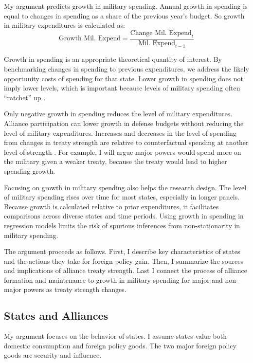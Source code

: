 \documentclass[12pt]{article}
\begin{document}
My argument predicts growth in military spending. 
Annual growth in spending is equal to changes in spending as a share of the previous year's budget. 
So growth in military expenditures is calculated as:
\begin{equation}
\mbox{Growth Mil. Expend} = \frac{ \mbox{Change Mil. Expend}_t }{ \mbox{Mil. Expend}_{t-1} }
\end{equation} 


Growth in spending is an appropriate theoretical quantity of interest. 
By benchmarking changes in spending to previous expenditures, we address the likely opportunity costs of spending for that state. 
Lower growth in spending does not imply lower levels, which is important because levels of military spending often ``ratchet'' up \citep{Zielinskietal2017}. 
 
Only negative growth in spending reduces the level of military expenditures. 
Alliance participation can lower growth in defense budgets without reducing the level of military expenditures. 
Increases and decreases in the level of spending from changes in treaty strength are relative to counterfactual spending at another level of strength \citep{Fearon1991}. 
For example, I will argue major powers would spend more on the military given a weaker treaty, because the treaty would lead to higher spending growth. 


Focusing on growth in military spending also helps the research design. 
The level of military spending rises over time for most states, especially in longer panels. 
Because growth is calculated relative to prior expenditures, it facilitates comparisons across diverse states and time periods. 
Using growth in spending in regression models limits the risk of spurious inferences from non-stationarity in military spending.


The argument proceeds as follows.
First, I describe key characteristics of states and the actions they take for foreign policy gain. 
Then, I summarize the sources and implications of alliance treaty strength. 
Last I connect the process of alliance formation and maintenance to growth in military spending for major and non-major powers as treaty strength changes.  



\subsection{States and Alliances}


My argument focuses on the behavior of states. 
I assume states value both domestic consumption and foreign policy goods. 
The two major foreign policy goods are security and influence. 
\end{document}
